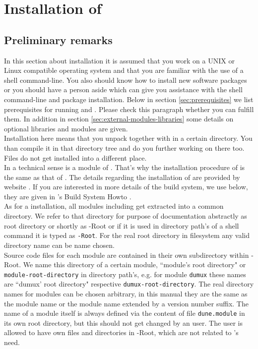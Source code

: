\section{Installation of \Dumux} \label{install}
\subsection{Preliminary remarks}

In this section about installation it is assumed that you work on a UNIX or Linux compatible operating system
and that you are familiar with the use of a shell command-line.  You also should know how to install new software packages
or you should have a person aside which can give you assistance with the shell command-line and package installation. 
Below in section \ref{sec:prerequisites} we list prerequisites for running \Dune and \Dumux. 
Please check this paragraph whether you can fulfill them.
In addition in section \ref{sec:external-modules-libraries} some details on optional libraries and modules are given. \\

Installation here means that you unpack \Dune together with \Dumux in a certain directory.
You than compile it in that directory tree and do you further working on there too. Files do not get installed into a different place.\\

In a technical sense \Dumux is a module of \Dune. 
That's why the installation procedure of \Dumux is the same as that of \Dune. 
The details regarding the installation of \Dune are provided by \Dune website \cite{DUNE-INST}. 
If you are interested in more details of the build system, we use below,
they are given in {\Dune}'s Build System Howto \cite{DUNE-BS}.\\


As for a \Dune installation, all \Dune modules including \Dumux get extracted into a common directory. We refer to that directory for purpose of documentation abstractly as {\Dune} root directory or shortly as {\Dune}-Root or if it is used in directory path's of a shell command it is typed as \texttt{\Dune-Root}. For the real {\Dune} root directory in filesystem any valid directory name can be name chosen.\\

Source code files for each \Dune module are contained in their own subdirectory within {\Dune}-Root.
We name this directory of a certain module, ``module's root directory" or \texttt{module-root-directory} in directory path's,
e.g. for module \texttt{dumux} these names are  ``dumux' root directory" respective \texttt{dumux-root-directory}.
The real directory names for modules can be chosen arbitrary, in this manual they are the same as the
module name or the module name extended by a version number suffix.
The name of a \Dune module itself is always defined via the content of file \texttt{dune.module} in its own root
directory, but this should not get changed by an user. The user is allowed to have own files and directories in \Dune-Root, which are not related to \Dune's need.


